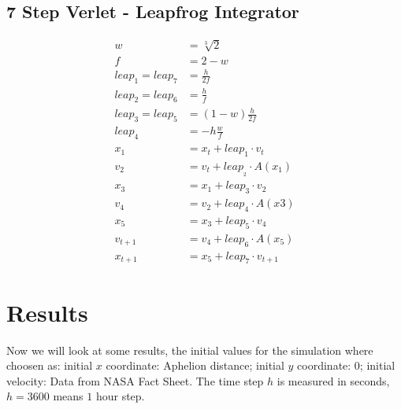 \documentclass[12pt]{article}
\begin{document}
 \subsection{7 Step Verlet - Leapfrog Integrator}
 \begin{align*}
  w &= \sqrt[3]{2}\\
  f &= 2 - w\\
  leap_1 = leap_7 &= \frac{h}{2f}\\
  leap_2 = leap_6 &= \frac{h}{f}\\
  leap_3 = leap_5 &= (1-w) \frac{h}{2f}\\
  leap_4 &= -h \frac{w}{f}\\
  x_{1} &= x_t + leap_1 \cdot v_t\\
  v_{2} &= v_t + leap__2 \cdot A(x_{1})\\
  x_{3} &= x_{1} + leap_3 \cdot v_{2}\\
  v_{4} &= v_{2} + leap_4 \cdot A(x{3})\\
  x_{5} &= x_{3} + leap_5 \cdot v_{4}\\
  v_{t+1} &= v_{4} + leap_6 \cdot A(x_{5})\\
  x_{t+1} &= x_{5} + leap_7 \cdot v_{t+1}
 \end{align*}

\section{Results}\label{sec:figs}
Now we will look at some results, the initial values for the simulation where choosen as: initial \(x\) coordinate: Aphelion distance; initial \(y\) coordinate: 0; initial velocity: Data from NASA Fact Sheet. The time step \(h\) is measured in seconds, \(h = 3600\) means \(1\) hour step.
\end{document}
